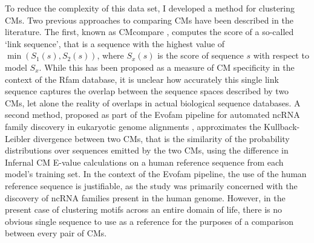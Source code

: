 To reduce the complexity of this data set, I developed a method for clustering CMs. Two previous approaches to comparing CMs have been described in the literature. The first, known as CMcompare \parencite{Honer-zu-Siederdissen2010}, computes the score of a so-called `link sequence', that is a sequence with the highest value of $\min{(S_1(s), S_2(s))}$, where $S_x(s)$ is the score of sequence $s$ with respect to model $S_x$. While this has been proposed as a measure of CM specificity in the context of the Rfam database, it is unclear how accurately this single link sequence captures the overlap between the sequence spaces described by two CMs, let alone the reality of overlaps in actual biological sequence databases. A second method, proposed as part of the Evofam pipeline for automated ncRNA family discovery in eukaryotic genome alignments \parencite{Parker2011}, approximates the Kullback-Leibler divergence between two CMs, that is the similarity of the probability distributions over sequences emitted by the two CMs, using the difference in Infernal CM E-value calculations on a human reference sequence from each model's training set. In the context of the Evofam pipeline, the use of the human reference sequence is justifiable, as the study was primarily concerned with the discovery of ncRNA families present in the human genome. However, in the present case of clustering motifs across an entire domain of life, there is no obvious single sequence to use as a reference for the purposes of a comparison between every pair of CMs.

